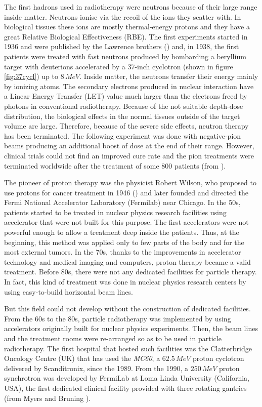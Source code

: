 \documentclass[12pt, a4paper, twoside]{book}
\begin{document}
The first hadrons used in radiotherapy were neutrons because of their large range inside matter. Neutrons ionise via the recoil of the ions they scatter with. In biological tissues these ions are mostly thermal-energy protons and they have a great Relative Biological Effectiveness (RBE). 
The first experiments started in 1936 and were published by the Lawrence brothers (\cite{law:neut}) and, in 1938, the first patients were treated with fast neutrons produced by bombarding a beryllium target with deuterions accelerated by a 37-inch cyclotron (shown in figure \ref{fig:37cycl}) up to $8\,MeV$. Inside matter, the neutrons transfer their energy mainly by ionizing atoms. The secondary electrons produced in nuclear interaction have a Linear Energy Transfer (LET) value much larger than the electrons freed by photons in conventional radiotherapy.
Because of the not suitable depth-dose distribution, the biological effects in the normal tissues outside of the target volume are large. Therefore, because of the severe side effects, neutron therapy has been terminated.
The following experiment was done with negative-pion beams producing an additional boost of dose at the end of their range. However, clinical trials could not find an improved cure rate and the pion treatments were terminated worldwide after the treatment of some 800 patients (from \cite{blatt:pio}).

The pioneer of proton therapy was the physicist Robert Wilson, who proposed to use protons for cancer treatment in 1946 (\cite{wils:hadr}) and later founded and directed the Fermi National Accelerator Laboratory (Fermilab) near Chicago.
In the 50s, patients started to be treated in nuclear physics research facilities using accelerator that were not built for this purpose.
The first accelerators were not powerful enough to allow a treatment deep inside the patients. Thus, at the beginning, this method was applied only to few parts of the body and for the most external tumors.
In the 70s, thanks to the improvements in accelerator technology and medical imaging and computers, proton therapy became a valid treatment.
Before 80s, there were not any dedicated facilities for particle therapy. In fact, this kind of treatment was done in nuclear physics research centers by using easy-to-build horizontal beam lines.

But this field could not develop without the construction of dedicated facilities. 
From the 60s to the 80s, particle radiotherapy was implemented by using accelerators originally built for nuclear physics experiments. Then, the beam lines and the treatment rooms were re-arranged so as to be used in particle radiotherapy. The first hospital that hosted such facilities was the Clatterbridge Oncology Centre (UK) that has used the \emph{MC60}, a $62.5\,MeV$ proton cyclotron delivered by Scanditronix, since the 1989. From the 1990, a $250\,MeV$ proton synchrotron was developed by FermiLab at Loma Linda University (California, USA), the first dedicated clinical facility provided with three rotating gantries (from Myers and Bruning \cite{mye:acc}).
\end{document}
